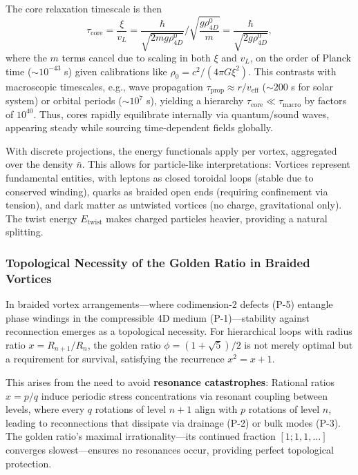 The core relaxation timescale is then
\begin{equation}
\tau_{\text{core}} = \frac{\xi}{v_L} = \frac{\hbar}{\sqrt{2 m g \rho_{4D}^0}} / \sqrt{\frac{g \rho_{4D}^0}{m}} = \frac{\hbar}{\sqrt{2 g \rho_{4D}^0}},
\end{equation}
where the $m$ terms cancel due to scaling in both $\xi$ and $v_L$, on the order of Planck time ($\sim 10^{-43}$ s) given calibrations like $\rho_0 = c^2 / (4\pi G \xi^2)$. This contrasts with macroscopic timescales, e.g., wave propagation $\tau_{\text{prop}} \approx r / v_{\text{eff}}$ ($\sim 200$ s for solar system) or orbital periods ($\sim 10^7$ s), yielding a hierarchy $\tau_{\text{core}} \ll \tau_{\text{macro}}$ by factors of $10^{40}$. Thus, cores rapidly equilibrate internally via quantum/sound waves, appearing steady while sourcing time-dependent fields globally.

With discrete projections, the energy functionals apply per vortex, aggregated over the density $\bar{n}$. This allows for particle-like interpretations: Vortices represent fundamental entities, with leptons as closed toroidal loops (stable due to conserved winding), quarks as braided open ends (requiring confinement via tension), and dark matter as untwisted vortices (no charge, gravitational only). The twist energy $E_{\text{twist}}$ makes charged particles heavier, providing a natural splitting.

\subsubsection{Topological Necessity of the Golden Ratio in Braided Vortices}

In braided vortex arrangements---where codimension-2 defects (P-5) entangle phase windings in the compressible 4D medium (P-1)---stability against reconnection emerges as a topological necessity. For hierarchical loops with radius ratio $x = R_{n+1}/R_n$, the golden ratio $\phi = (1 + \sqrt{5})/2$ is not merely optimal but a requirement for survival, satisfying the recurrence $x^2 = x + 1$.

This arises from the need to avoid \textbf{resonance catastrophes}: Rational ratios $x = p/q$ induce periodic stress concentrations via resonant coupling between levels, where every $q$ rotations of level $n+1$ align with $p$ rotations of level $n$, leading to reconnections that dissipate via drainage (P-2) or bulk modes (P-3). The golden ratio's maximal irrationality---its continued fraction $[1; 1, 1, \ldots]$ converges slowest---ensures no resonances occur, providing perfect topological protection.

